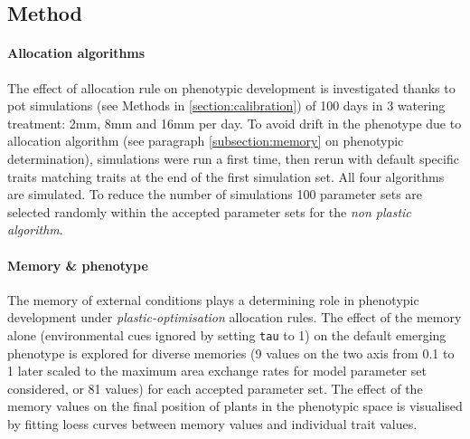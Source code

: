 \subsection{Method}



\paragraph{Allocation algorithms}
The effect of allocation rule on phenotypic development is investigated thanks to pot simulations (see Methods in \ref{section:calibration}) of 100 days in 3 watering treatment: 2mm, 8mm and 16mm per day. To avoid drift in the phenotype due to allocation algorithm (see paragraph \ref{subsection:memory} on phenotypic determination), simulations were run a first time, then rerun with default specific traits matching traits at the end of the first simulation set. All four algorithms are simulated. To reduce the number of simulations 100 parameter sets are selected randomly within the accepted parameter sets for the \textit{non plastic algorithm}.

\paragraph{Memory \& phenotype}
The memory of external conditions plays a determining role in phenotypic development under \textit{plastic-optimisation} allocation rules. The effect of the memory alone (environmental cues ignored by setting \texttt{tau} to 1) on the default emerging phenotype is explored for diverse memories (9 values on the two axis from 0.1 to 1 later scaled to the maximum area exchange rates for model parameter set considered, or 81 values) for each accepted parameter set. The effect of the memory values on the final position of plants in the phenotypic space is visualised by fitting loess curves between memory values and individual trait values.

